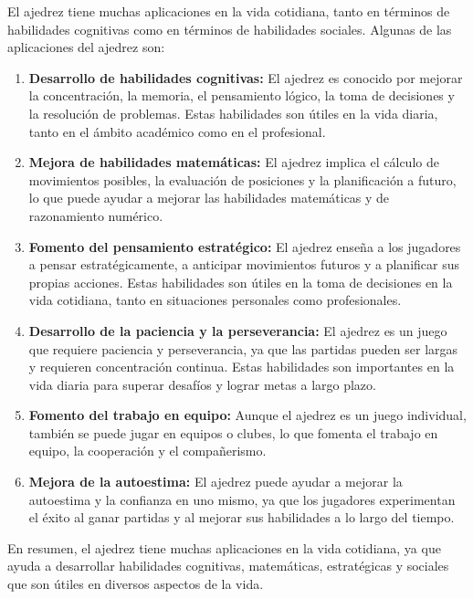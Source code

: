 El ajedrez tiene muchas aplicaciones en la vida cotidiana, tanto en términos de habilidades cognitivas como en términos de habilidades sociales. Algunas de las aplicaciones del ajedrez son:
\begin{enumerate}


\item \textbf{Desarrollo de habilidades cognitivas:} El ajedrez es conocido por mejorar la concentración, la memoria, el pensamiento lógico, la toma de decisiones y la resolución de problemas. Estas habilidades son útiles en la vida diaria, tanto en el ámbito académico como en el profesional.

\item \textbf{Mejora de habilidades matemáticas:} El ajedrez implica el cálculo de movimientos posibles, la evaluación de posiciones y la planificación a futuro, lo que puede ayudar a mejorar las habilidades matemáticas y de razonamiento numérico.

\item \textbf{Fomento del pensamiento estratégico:} El ajedrez enseña a los jugadores a pensar estratégicamente, a anticipar movimientos futuros y a planificar sus propias acciones. Estas habilidades son útiles en la toma de decisiones en la vida cotidiana, tanto en situaciones personales como profesionales.

\item \textbf{Desarrollo de la paciencia y la perseverancia:} El ajedrez es un juego que requiere paciencia y perseverancia, ya que las partidas pueden ser largas y requieren concentración continua. Estas habilidades son importantes en la vida diaria para superar desafíos y lograr metas a largo plazo.

\item \textbf{Fomento del trabajo en equipo:} Aunque el ajedrez es un juego individual, también se puede jugar en equipos o clubes, lo que fomenta el trabajo en equipo, la cooperación y el compañerismo.

 \item \textbf{Mejora de la autoestima:} El ajedrez puede ayudar a mejorar la autoestima y la confianza en uno mismo, ya que los jugadores experimentan el éxito al ganar partidas y al mejorar sus habilidades a lo largo del tiempo.

\end{enumerate}

En resumen, el ajedrez tiene muchas aplicaciones en la vida cotidiana, ya que ayuda a desarrollar habilidades cognitivas, matemáticas, estratégicas y sociales que son útiles en diversos aspectos de la vida.

